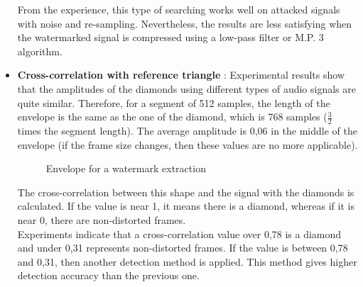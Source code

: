 \begin{itemize}
From the experience, this type of searching works well on attacked signals with noise and re-sampling. Nevertheless, the results are less satisfying when the watermarked signal is compressed using a low-pass filter or M.P. 3 algorithm.
\item \textbf{Cross-correlation with reference triangle} : Experimental results show that the amplitudes of the diamonds using different types of audio signals are quite similar. Therefore, for a segment of 512 samples, the length of the envelope is the same as the one of the diamond, which is 768 samples ($\frac{3}{2}$ times the segment length). The average amplitude is 0,06 in the middle of the envelope (if the frame size changes, then these values are no more applicable).
\begin{figure}[H]
\caption{\label{envelope} Envelope for a watermark extraction}
\end{figure}
The cross-correlation between this shape and the signal with the diamonds is calculated. If the value is near 1, it means there is a diamond, whereas if it is near 0, there are non-distorted frames.\\
Experiments indicate that a cross-correlation value over 0,78 is a diamond and under 0,31 represents non-distorted frames. If the value is between 0,78 and 0,31, then another detection method is applied. This method gives higher detection accuracy than the previous one.
\end{itemize}


